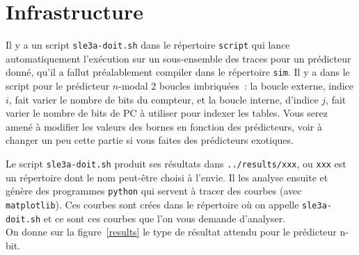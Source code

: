 \documentclass[a4paper]{article}
\begin{document}
\section{Infrastructure}

Il y a un script \verb+sle3a-doit.sh+ dans le répertoire \verb+script+ qui lance automatiquement l'exécution sur un sous-ensemble des traces pour un prédicteur donné, qu'il a fallut préalablement compiler dans le répertoire \verb+sim+.
Il y a dans le script pour le prédicteur $n$-modal 2 boucles imbriquées~: la boucle externe, indice $i$, fait varier le nombre de bits du compteur, et la boucle interne, d'indice $j$, fait varier le nombre de bits de PC à utiliser pour indexer les tables.
Vous serez amené à modifier les valeurs des bornes en fonction des prédicteurs, voir à changer un peu cette partie si vous faites des prédicteurs exotiques.

Le script \verb+sle3a-doit.sh+ produit ses résultats dans \verb+../results/xxx+, ou \verb+xxx+ est un répertoire dont le nom peut-être choisi à l'envie.
Il les analyse ensuite et génère des programmes \texttt{python} qui servent à tracer des courbes (avec \texttt{matplotlib}). Ces courbes sont crées dans le répertoire où on appelle \verb+sle3a-doit.sh+ et ce sont ces courbes que l'on vous demande d'analyser. \\

On donne sur la figure~\ref{results} le type de résultat attendu pour le prédicteur n-bit.
\end{document}
